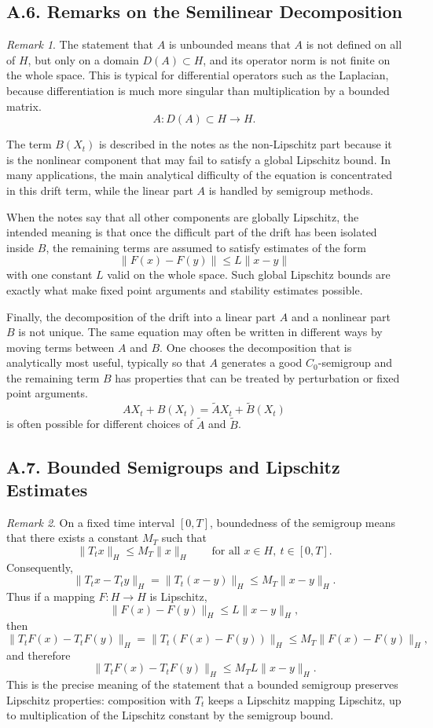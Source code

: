 \documentclass[11pt]{article}
\theoremstyle{definition}
\theoremstyle{remark}
\newtheorem{remark}{Remark}
\begin{document}
\subsection*{A.6. Remarks on the Semilinear Decomposition}
\begin{remark}
The statement that \(A\) is unbounded means that \(A\) is not defined on all of \(H\), but only on a domain \(D(A)\subset H\), and its operator norm is not finite on the whole space. This is typical for differential operators such as the Laplacian, because differentiation is much more singular than multiplication by a bounded matrix.
\[
A:D(A)\subset H\to H.
\]

The term \(B(X_t)\) is described in the notes as the non-Lipschitz part because it is the nonlinear component that may fail to satisfy a global Lipschitz bound. In many applications, the main analytical difficulty of the equation is concentrated in this drift term, while the linear part \(A\) is handled by semigroup methods.

When the notes say that all other components are globally Lipschitz, the intended meaning is that once the difficult part of the drift has been isolated inside \(B\), the remaining terms are assumed to satisfy estimates of the form
\[
\|F(x)-F(y)\|\le L\|x-y\|
\]
with one constant \(L\) valid on the whole space. Such global Lipschitz bounds are exactly what make fixed point arguments and stability estimates possible.

Finally, the decomposition of the drift into a linear part \(A\) and a nonlinear part \(B\) is not unique. The same equation may often be written in different ways by moving terms between \(A\) and \(B\). One chooses the decomposition that is analytically most useful, typically so that \(A\) generates a good \(C_0\)-semigroup and the remaining term \(B\) has properties that can be treated by perturbation or fixed point arguments.
\[
AX_t+B(X_t)=\widetilde A X_t+\widetilde B(X_t)
\]
is often possible for different choices of \(\widetilde A\) and \(\widetilde B\).
\end{remark}

\subsection*{A.7. Bounded Semigroups and Lipschitz Estimates}
\begin{remark}
On a fixed time interval \([0,T]\), boundedness of the semigroup means that there exists a constant \(M_T\) such that
\[
\|T_t x\|_H\le M_T\|x\|_H
\qquad \text{for all } x\in H,\ t\in[0,T].
\]
Consequently,
\[
\|T_t x-T_t y\|_H
=
\|T_t(x-y)\|_H
\le
M_T\|x-y\|_H.
\]
Thus if a mapping \(F:H\to H\) is Lipschitz,
\[
\|F(x)-F(y)\|_H\le L\|x-y\|_H,
\]
then
\[
\|T_tF(x)-T_tF(y)\|_H
=
\|T_t(F(x)-F(y))\|_H
\le
M_T\|F(x)-F(y)\|_H,
\]
and therefore
\[
\|T_tF(x)-T_tF(y)\|_H
\le
M_TL\|x-y\|_H.
\]
This is the precise meaning of the statement that a bounded semigroup preserves Lipschitz properties: composition with \(T_t\) keeps a Lipschitz mapping Lipschitz, up to multiplication of the Lipschitz constant by the semigroup bound.
\end{remark}
\end{document}
